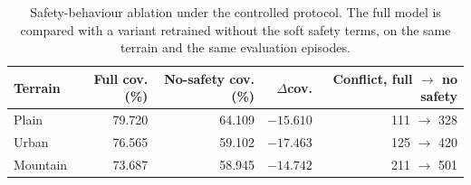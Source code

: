 \begin{table}[!t]

\centering
\caption{Safety-behaviour ablation under the controlled protocol. The full model is compared with a variant retrained without the soft safety terms, on the same terrain and the same evaluation episodes.}
\label{tab:safety-ablation}
\footnotesize
\setlength{\tabcolsep}{5pt}
\begin{tabular}{lrrrr}
\toprule
Terrain & Full cov. (\%) & No-safety cov. (\%) & $\Delta$cov. & Conflict, full $\rightarrow$ no safety \\
\midrule
Plain & 79.720 & 64.109 & $-15.610$ & 111 $\rightarrow$ 328 \\
Urban & 76.565 & 59.102 & $-17.463$ & 125 $\rightarrow$ 420 \\
Mountain & 73.687 & 58.945 & $-14.742$ & 211 $\rightarrow$ 501 \\
\bottomrule
\end{tabular}
\end{table}